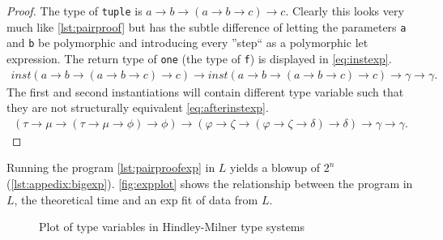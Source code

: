 \documentclass[11pt,oneside,a4paper]{report}
\begin{document}
\begin{proof}
    The type of \texttt{tuple} is $a \rightarrow b \rightarrow (a \rightarrow b \rightarrow c) \rightarrow c$.
    Clearly this looks very much like \autoref{lst:pairproof} but has the subtle difference of letting the parameters \texttt{a} and \texttt{b} be polymorphic and introducing every ''step`` as a polymorphic let expression.
    The return type of \texttt{one} (the type of \texttt{f}) is displayed in \autoref{eq:instexp}.
    \begin{align}
        \textit{inst}(a \rightarrow b \rightarrow (a \rightarrow b \rightarrow c) \rightarrow c) \rightarrow \textit{inst}(a \rightarrow b \rightarrow (a \rightarrow b \rightarrow c) \rightarrow c) \rightarrow \gamma \rightarrow \gamma.
        \label{eq:instexp}
    \end{align}
    The first and second instantiations will contain different type variable such that they are not structurally equivalent \autoref{eq:afterinstexp}.
    \begin{align}
        (\tau \rightarrow \mu \rightarrow (\tau \rightarrow \mu \rightarrow \phi) \rightarrow \phi) \rightarrow (\varphi \rightarrow \zeta \rightarrow (\varphi \rightarrow \zeta \rightarrow \delta) \rightarrow \delta) \rightarrow \gamma \rightarrow \gamma.
        \label{eq:afterinstexp}
    \end{align}
\end{proof}
Running the program \autoref{lst:pairproofexp} in $L$ yields a blowup of $2^n$ (\autoref{lst:appedix:bigexp}).
\autoref{fig:expplot} shows the relationship between the program in $L$, the theoretical time and an exp fit of data from $L$.
\begin{figure}[ht]
    \centering
{}
    \caption{Plot of type variables in Hindley-Milner type systems}
    \label{fig:expplot}
\end{figure}
\end{document}
